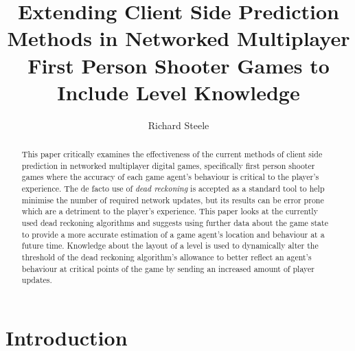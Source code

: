 \documentclass[journal]{IEEEtran}
\begin{document}
%
\title{Extending Client Side Prediction Methods in Networked Multiplayer First Person Shooter Games to Include Level Knowledge}
%
%
\author{Richard Steele}


\maketitle

\begin{abstract}
This paper critically examines the effectiveness of the current methods of client side prediction in networked multiplayer digital games, specifically first person shooter games where the accuracy of each game agent's behaviour is critical to the player's experience. The de facto use of \textit{dead reckoning} is accepted as a standard tool to help minimise the number of required network updates, but its results can be error prone which are a detriment to the player's experience. This paper looks at the currently used dead reckoning algorithms and suggests using further data about the game state to provide a more accurate estimation of a game agent's location and behaviour at a future time. Knowledge about the layout of a level is used to dynamically alter the threshold of the dead reckoning algorithm's allowance to better reflect an agent's behaviour at critical points of the game by sending an increased amount of player updates.
\end{abstract}

\section{Introduction}
% 
% 
% 
\end{document}
